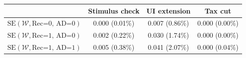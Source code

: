 \begin{tabular}{@{}lccc@{}}
\toprule
                          & Stimulus check      & UI extension    & Tax cut    \\  \midrule
$\mathrm{SE}(\mathcal{W}, \text{Rec=0, AD=0})$ & 0.000 (0.01\%)  & 0.007 (0.86\%)  & 0.000 (0.00\%)     \\
$\mathrm{SE}(\mathcal{W}, \text{Rec=1, AD=0})$ & 0.002 (0.22\%)  & 0.030 (1.74\%)  & 0.000 (0.00\%)     \\
$\mathrm{SE}(\mathcal{W}, \text{Rec=1, AD=1})$ & 0.005 (0.38\%)  & 0.041 (2.07\%)  & 0.000 (0.04\%)     \\ \bottomrule
\end{tabular}
